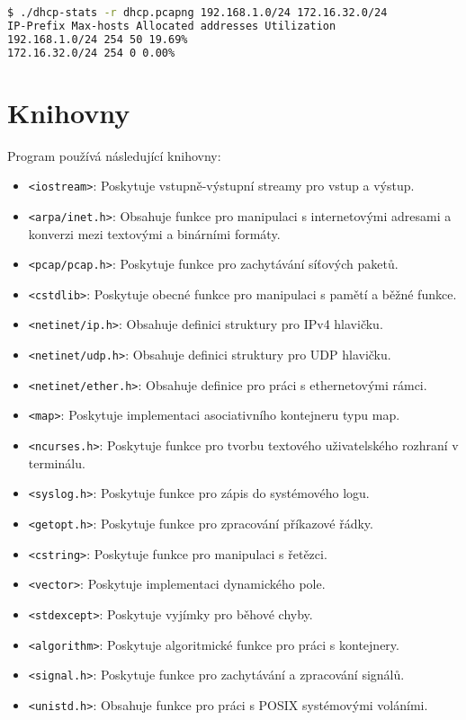 \documentclass[a4paper, 11pt]{article}
\begin{document}
    \begin{lstlisting}[language=bash]
$ ./dhcp-stats -r dhcp.pcapng 192.168.1.0/24 172.16.32.0/24
IP-Prefix Max-hosts Allocated addresses Utilization
192.168.1.0/24 254 50 19.69%
172.16.32.0/24 254 0 0.00%
    \end{lstlisting}

    \section{Knihovny}
    Program používá následující knihovny:
    \begin{itemize}
        \item \texttt{<iostream>}: Poskytuje vstupně-výstupní streamy pro vstup a výstup.
        \item \texttt{<arpa/inet.h>}: Obsahuje funkce pro manipulaci s internetovými adresami a konverzi mezi textovými a binárními formáty.
        \item \texttt{<pcap/pcap.h>}: Poskytuje funkce pro zachytávání síťových paketů.
        \item \texttt{<cstdlib>}: Poskytuje obecné funkce pro manipulaci s pamětí a běžné funkce.
        \item \texttt{<netinet/ip.h>}: Obsahuje definici struktury pro IPv4 hlavičku.
        \item \texttt{<netinet/udp.h>}: Obsahuje definici struktury pro UDP hlavičku.
        \item \texttt{<netinet/ether.h>}: Obsahuje definice pro práci s ethernetovými rámci.
        \item \texttt{<map>}: Poskytuje implementaci asociativního kontejneru typu map.
        \item \texttt{<ncurses.h>}: Poskytuje funkce pro tvorbu textového uživatelského rozhraní v terminálu.
        \item \texttt{<syslog.h>}: Poskytuje funkce pro zápis do systémového logu.
        \item \texttt{<getopt.h>}: Poskytuje funkce pro zpracování příkazové řádky.
        \item \texttt{<cstring>}: Poskytuje funkce pro manipulaci s řetězci.
        \item \texttt{<vector>}: Poskytuje implementaci dynamického pole.
        \item \texttt{<stdexcept>}: Poskytuje vyjímky pro běhové chyby.
        \item \texttt{<algorithm>}: Poskytuje algoritmické funkce pro práci s kontejnery.
        \item \texttt{<signal.h>}: Poskytuje funkce pro zachytávání a zpracování signálů.
        \item \texttt{<unistd.h>}: Obsahuje funkce pro práci s POSIX systémovými voláními.
    \end{itemize}
\end{document}

